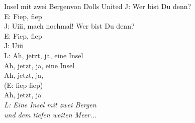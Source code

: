 \begin{lied*}{Insel mit zwei Bergen}{von Dolls United}
J: Wer bist Du denn?\\
E: Fiep, fiep\\
J: Uiii, mach nochmal! Wer bist Du denn?\\
E: Fiep, fiep\\
J: Uiii\\
L: Ah, jetzt, ja, eine Insel\\
Ah, jetzt, ja, eine Insel\\
Ah, jetzt, ja,\\
(E: fiep fiep)\\
Ah, jetzt, ja\\

\textit{L: Eine Insel mit zwei Bergen\\
und dem tiefen weiten Meer...}\\
\end{lied*}